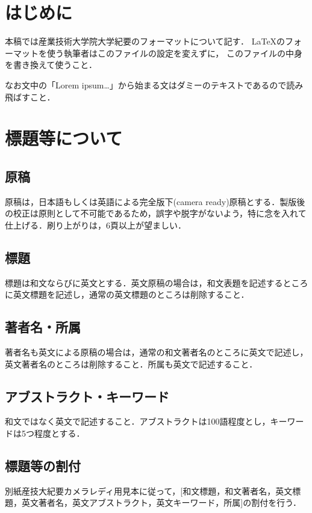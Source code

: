 \begin{multicols}{2}
\section{はじめに}
本稿では産業技術大学院大学紀要のフォーマットについて記す．
\LaTeX のフォーマットを使う執筆者はこのファイルの設定を変えずに，
このファイルの中身を書き換えて使うこと．

なお文中の「Lorem ipsum\ldots」から始まる文はダミーのテキストであるので読み飛ばすこと．

\section{標題等について}
\subsection{原稿}
原稿は，日本語もしくは英語による完全版下(camera ready)原稿とする．製版後の校正は原則として不可能であるため，誤字や脱字がないよう，特に念を入れて仕上げる．刷り上がりは，6頁以上が望ましい．

\subsection{標題}
標題は和文ならびに英文とする．英文原稿の場合は，和文表題を記述するところに英文標題を記述し，通常の英文標題のところは削除すること．

\subsection{著者名・所属}
著者名も英文による原稿の場合は，通常の和文著者名のところに英文で記述し，英文著者名のところは削除すること．所属も英文で記述すること．

\subsection{アブストラクト・キーワード}
和文ではなく英文で記述すること．アブストラクトは100語程度とし，キーワードは5つ程度とする．

\subsection{標題等の割付}
別紙産技大紀要カメラレディ用見本に従って，[和文標題，和文著者名，英文標
題，英文著者名，英文アブストラクト，英文キーワード，所属]の割付を行う．


\end{multicols}
